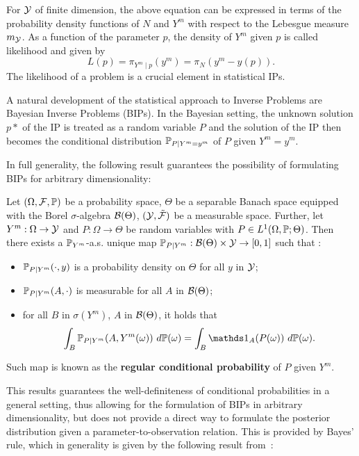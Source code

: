 For $\mathcal Y$ of finite dimension, the above equation can be expressed in terms of the probability density functions of $N$ and $Y^m$ with respect to the Lebesgue measure $m_\mathcal Y$.
As a function of the parameter $p$, the density of $Y^m$ given $p$ is called likelihood and given by
\begin{equation}\label{eq:likelihood}
    L(p) = \pi_{Y^m \mid p} (y^m) = \pi_N(y^m - y(p)).
\end{equation}
The likelihood of a problem is a crucial element in statistical IPs. \medskip

A natural development of the statistical approach to Inverse Problems are Bayesian Inverse Problems (BIPs). 
In the Bayesian setting, the unknown solution $p*$ of the IP is treated as a random variable $P$ and the solution of the IP then becomes the conditional distribution $\mathbb P_{P \mid Y^m=y^m} $ of $P$ given $Y^m=y^m$.

In full generality, the following result guarantees the possibility of formulating BIPs for arbitrary dimensionality:
\begin{thm} 
    Let $ (\Omega, \mathcal F , \mathbb P) $ be a probability space, $\Theta$ be a separable Banach space equipped with the Borel $\sigma$-algebra $\mathcal B (\Theta)$, $(\mathcal Y, \tilde{\mathcal F})$ be a measurable space.
    Further, let $Y^m:\Omega \rightarrow \mathcal Y$ and $P : \Omega \rightarrow \Theta$ be random variables with $P \in L^1(\Omega, \mathbb P; \Theta) $. \newline
    Then there exists a $\mathbb P_{Y^m}$-a.s. unique map $\mathbb P_{P \mid Y^m} : \mathcal B (\Theta) \times \mathcal Y \rightarrow [0,1] $ such that :
    \begin{itemize}
        \item $\mathbb P_{P \mid Y^m}(\cdot, y)$ is a probability density on $\Theta$ for all $y$ in $\mathcal Y$;
        \item $\mathbb P_{P \mid Y^m}(A, \cdot)$ is measurable for all $A$ in $\mathcal B (\Theta)$;
        \item for all $B$ in $\sigma(Y^m)$, $A$ in $\mathcal B (\Theta)$, it holds that
                \[ 
                \int_B \bb P_{P \mid Y^m}(A, Y^m(\omega)) \ d\bb P(\omega)= \int_B \ind_A(P(\omega)) \ d\bb P(\omega).
                \] 
    \end{itemize}
    Such map is known as the \textbf{regular conditional probability} of $P$ given $Y^m$.
\end{thm}

This results guarantees the well-definiteness of conditional probabilities in a general setting, thus allowing for the formulation of BIPs in arbitrary dimensionality, but does not provide a direct way to formulate the posterior distribution given a parameter-to-observation relation. 
This is provided by Bayes' rule, which in generality is given by the following result from~\cite[Theorem 14]{DashtiStuart2017}:

